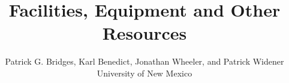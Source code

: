 \documentclass[11pt]{article}
\begin{document}
\title{Facilities, Equipment and Other Resources}
\author{Patrick G. Bridges, Karl Benedict, Jonathan Wheeler, and Patrick Widener\\University of New Mexico}
\date{}

\maketitle
\end{document}
